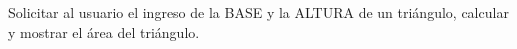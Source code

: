 ﻿
Solicitar al usuario el ingreso de la BASE y la ALTURA de un triángulo, calcular y mostrar el área del triángulo.



\volverindice
\newpage
